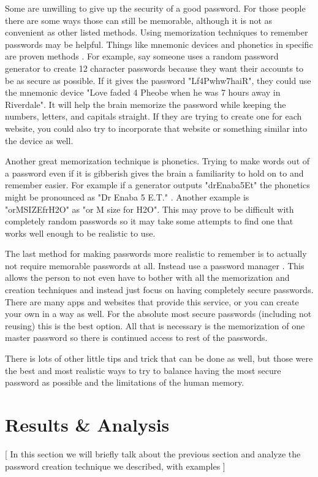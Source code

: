 \documentclass[acmsmall,nonacm]{acmart}
\begin{document}
Some are unwilling to give up the security of a good password. For those people there are some ways those can still be memorable, although it is not as convenient as other listed methods. Using memorization techniques to remember passwords may be helpful. Things like mnemonic devices and phonetics in specific are proven methods \cite{rubenking_2021}. For example, say someone uses a random password generator to create 12 character passwords because they want their accounts to be as secure as possible. If it gives the password "Lf4Pwhw7haiR", they could use the mnemonic device "Love faded 4 Pheobe when he was 7 hours away in Riverdale". It will help the brain memorize the password while keeping the numbers, letters, and capitals straight. If they are trying to create one for each website, you could also try to incorporate that website or something similar into the device as well.


Another great memorization technique is phonetics. Trying to make words out of a password even if it is gibberish gives the brain a familiarity to hold on to and remember easier. For example if a generator outputs "drEnaba5Et" the phonetics might be pronounced as "Dr Enaba 5 E.T." \cite{rubenking_2021}. Another example is "orMSIZEfrH2O" as "or M size for H2O". This may prove to be difficult with completely random passwords so it may take some attempts to find one that works well enough to be realistic to use.


The last method for making passwords more realistic to remember is to actually not require memorable passwords at all. Instead use a password manager \cite{lee_2014}. This allows the person to not even have to bother with all the memorization and creation techniques and instead just focus on having completely secure passwords. There are many apps and websites that provide this service, or you can create your own in a way as well. For the absolute most secure passwords (including not reusing) this is the best option. All that is necessary is the memorization of one master password so there is continued access to rest of the passwords.


There is lots of other little tips and trick that can be done as well, but those were the best and most realistic ways to try to balance having the most secure password as possible and the limitations of the human memory.

\section{Results \& Analysis}
\textcolor{beaver}{[ In this section we will briefly talk about the previous section and analyze the password creation technique we described, with examples ]} 
\end{document}
